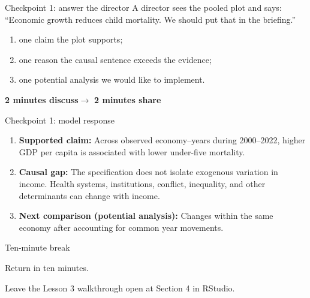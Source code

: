 \begin{frame}{Checkpoint 1: answer the director}
  A director sees the pooled plot and says: ``Economic growth reduces child
  mortality. We should put that in the briefing.''

  \vspace{0.5em}
  \begin{enumerate}
    \item one claim the plot supports;
    \item one reason the causal sentence exceeds the evidence;
    \item one potential analysis we would like to implement.
  \end{enumerate}

  \vfill
  \centering
  \textbf{2 minutes discuss}\qquad$\longrightarrow$\qquad
  \textbf{2 minutes share}
\end{frame}

\begin{frame}{Checkpoint 1: model response}
  \begin{enumerate}
    \item \textbf{Supported claim:} Across observed economy--years during
      2000--2022, higher GDP per capita is associated with lower under-five
      mortality.
    \item \textbf{Causal gap:} The specification does not isolate exogenous
      variation in income. Health systems, institutions, conflict, inequality,
      and other determinants can change with income.
    \item \textbf{Next comparison (potential analysis):} Changes within the same economy after
      accounting for common year movements.
  \end{enumerate}

\end{frame}

\begin{frame}[plain]{Ten-minute break}
  \vfill
  \begin{center}
    {\LARGE\color{crimson}Return in ten minutes.}\par
    \vspace{0.5em}
    Leave the Lesson 3 walkthrough open at Section 4 in RStudio.
  \end{center}
  \vfill
\end{frame}
